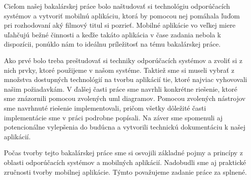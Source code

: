 Cieľom našej bakalárskej práce bolo naštudovať si technológiu odporúčacích systémov a vytvoriť mobilnú aplikáciu, ktorá by pomocou nej pomáhala ľuďom pri rozhodovaní aký filmový titul si pozrieť. Mobilné aplikácie vo veľkej miere uľahčujú bežné činnosti a keďže takáto aplikácia v čase zadania nebola k dispozícii, ponúklo nám to ideálnu príležitosť na tému bakalárskej práce.

Ako prvé bolo treba preštudovať si techniky odporúčacích systémov a zvoliť si z nich prvky, ktoré použijeme v našom systéme. Taktiež sme si museli vybrať z množstva dostupných technológií na tvorbu aplikácií tie, ktoré najviac vyhovovali našim požiadavkám. V ďalšej časti práce sme navrhli konkrétne riešenie, ktoré sme znázornili pomocou zvolených \acrshort{uml} diagramov. Pomocou zvolených nástrojov sme navrhnuté riešenie implementovali, pričom všetky dôležité časti implementácie sme v práci podrobne popísali. Na záver sme spomenuli aj potencionálne vylepšenia do budúcna a vytvorili technickú dokumentáciu k našej aplikácií. 

Počas tvorby tejto bakalárskej práce sme si osvojili základné pojmy a princípy z oblasti odporúčacích systémov a mobilných aplikácií. Nadobudli sme aj praktické zručnosti tvorby mobilnej aplikácie. Týmto považujeme zadanie práce za splnené.
